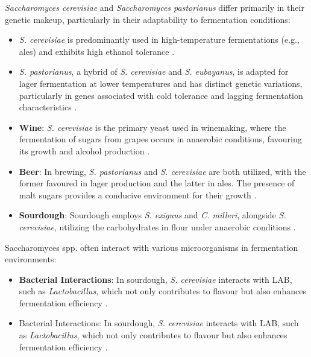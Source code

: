 \textit{Saccharomyces cerevisiae} and \textit{Saccharomyces pastorianus} differ primarily in their genetic makeup, particularly in their adaptability to fermentation conditions:
\begin{itemize}
    \item \textit{S. cerevisiae} is predominantly used in high-temperature fermentations (e.g., ales) and exhibits high ethanol tolerance \cite*{L9-Coryn,L6-Yeasts}.
    \item \textit{S. pastorianus}, a hybrid of \textit{S. cerevisiae} and \textit{S. eubayanus}, is adapted for lager fermentation at lower temperatures and has distinct genetic variations, particularly in genes associated with cold tolerance and lagging fermentation characteristics \cite*{L9-Coryn,L6-Yeasts}.
\end{itemize}

\begin{itemize}
    \item \textbf{Wine}: \textit{S. cerevisiae} is the primary yeast used in winemaking, where the fermentation of sugars from grapes occurs in anaerobic conditions, favouring its growth and alcohol production \cite*{L9-ISAPP,L9-Coryn,LabManual}.
    \item \textbf{Beer}: In brewing, \textit{S. pastorianus} and \textit{S. cerevisiae} are both utilized, with the former favoured in lager production and the latter in ales. The presence of malt sugars provides a conducive environment for their growth \cite*{L9-ISAPP,L9-Coryn}.
    \item \textbf{Sourdough}: Sourdough employs \textit{S. exiguus} and \textit{C. milleri}, alongside \textit{S. cerevisiae}, utilizing the carbohydrates in flour under anaerobic conditions \cite*{L9-Coryn,L6-Yeasts}.
\end{itemize}

Saccharomyces spp. often interact with various microorganisms in fermentation environments:
\begin{itemize}
    \item \textbf{Bacterial Interactions}: In sourdough, \textit{S. cerevisiae} interacts with LAB, such as \textit{Lactobacillus}, which not only contributes to flavour but also enhances fermentation efficiency \cite*{L9-Coryn}.
    \item Bacterial Interactions: In sourdough, \textit{S. cerevisiae} interacts with LAB, such as \textit{Lactobacillus}, which not only contributes to flavour but also enhances fermentation efficiency \cite*{LabManual}.
\end{itemize}

